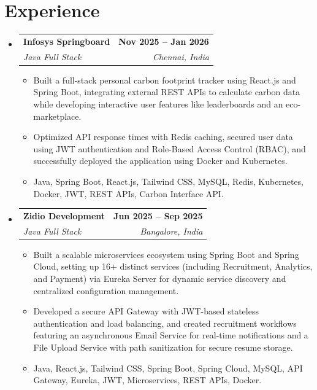 \documentclass[letterpaper,11pt]{article}
\makeatletter
\newcommand{\resumeItem}[1]{
  \item\small{
    {#1 \vspace{-2pt}}
  }
}
\newcommand{\resumeSubheading}[4]{
  \vspace{-2pt}\item
    \begin{tabular*}{1.0\textwidth}[t]{l@{\extracolsep{\fill}}r}
      \textbf{#1} & \textbf{\small #2} \\
      \textit{\small#3} & \textit{\small #4} \\
    \end{tabular*}\vspace{-7pt}
}
\newcommand{\resumeSubHeadingListStart}{\begin{itemize}[leftmargin=0.0in, label={}]}
\newcommand{\resumeSubHeadingListEnd}{\end{itemize}}
\newcommand{\resumeItemListStart}{\begin{itemize}}
\newcommand{\resumeItemListEnd}{\end{itemize}\vspace{-5pt}}
\makeatother
\begin{document}
\section{Experience}
  \resumeSubHeadingListStart

    \resumeSubheading
      {Infosys Springboard}{Nov 2025 -- Jan 2026}
      {Java Full Stack}{Chennai, India}
      \resumeItemListStart
        \resumeItem{Built a full-stack personal carbon footprint tracker using React.js and Spring Boot, integrating external REST APIs to calculate carbon data while developing interactive user features like leaderboards and an eco-marketplace.}
        \resumeItem{Optimized API response times with Redis caching, secured user data using JWT authentication and Role-Based Access Control (RBAC), and successfully deployed the application using Docker and Kubernetes.}
        \resumeItem{Java, Spring Boot, React.js, Tailwind CSS, MySQL, Redis, Kubernetes, Docker, JWT, REST APIs, Carbon Interface API.}
      \resumeItemListEnd

    \resumeSubheading
      {Zidio Development}{Jun 2025 -- Sep 2025}
      {Java Full Stack}{Bangalore, India}
      \resumeItemListStart
        \resumeItem{Built a scalable microservices ecosystem using Spring Boot and Spring Cloud, setting up 16+ distinct services (including Recruitment, Analytics, and Payment) via Eureka Server for dynamic service discovery and centralized configuration management.}
        \resumeItem{Developed a secure API Gateway with JWT-based stateless authentication and load balancing, and created recruitment workflows featuring an asynchronous Email Service for real-time notifications and a File Upload Service with path sanitization for secure resume storage.}
        \resumeItem{Java, React.js, Tailwind CSS, Spring Boot, Spring Cloud, MySQL, API Gateway, Eureka, JWT, Microservices, REST APIs, Docker.}
      \resumeItemListEnd

  \resumeSubHeadingListEnd
\vspace{-16pt}

\end{document}

